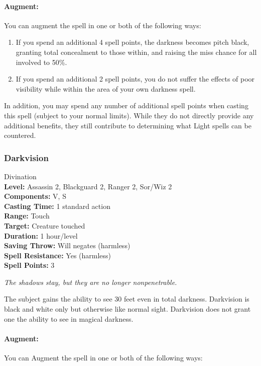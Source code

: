 \paragraph{Augment:} You can augment the spell in one or both of the following ways:
\begin{enumerate}
 \item If you spend an additional 4 spell points, the darkness becomes pitch black, 
 granting total concealment to those within, and raising the miss chance for all involved to 50\%.
 \item If you spend an additional 2 spell points, 
you do not suffer the effects of poor visibility while within the area of your own darkness spell.
\end{enumerate}
In addition, you may spend any number of additional spell points when casting this spell (subject to your normal limits). 
While they do not directly provide any additional benefits, they still contribute to determining what Light spells can be countered.
\subsubsection{Darkvision}
\label{Spell:Darkvision}
Divination
\\ \textbf{Level:} Assassin 2, Blackguard 2, Ranger 2, Sor/Wiz 2
\\ \textbf{Components:} V, S
\\ \textbf{Casting Time:} 1 standard action
\\ \textbf{Range:} Touch
\\ \textbf{Target:} Creature touched
\\ \textbf{Duration:} 1 hour/level
\\ \textbf{Saving Throw:} Will negates (harmless)
\\ \textbf{Spell Resistance:} Yes (harmless)
\\ \textbf{Spell Points:} 3

\emph{The shadows stay, but they are no longer nonpenetrable. }

The subject gains the ability to see 30 feet even in total darkness. 
Darkvision is black and white only but otherwise like normal sight. 
Darkvision does not grant one the ability to see in magical darkness.

\paragraph{Augment:} You can Augment the spell in one or both of the following ways:

